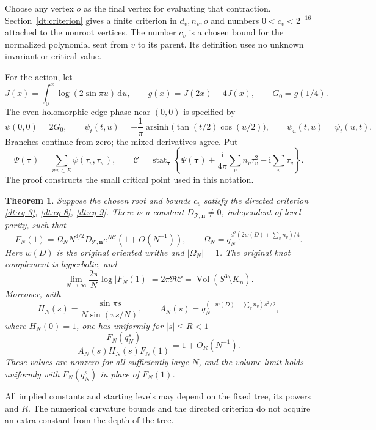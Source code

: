 \documentclass[11pt]{article}
\numberwithin{equation}{section}
\newtheorem{theorem}{Theorem}[section]
\theoremstyle{definition}\newtheorem{definition}[theorem]{Definition}
\theoremstyle{remark}\newtheorem{remark}[theorem]{Remark}
\newcommand{\ii}{\mathrm i}
\newcommand{\dd}{\mathrm d}
\newcommand{\Vol}{\operatorname{Vol}}
\begin{document}
Choose any vertex \(o\) as the final vertex for evaluating that
contraction. Section~\ref{dt:criterion} gives a finite criterion in
\(d_v,n_v,o\) and numbers \(0<c_v<2^{-16}\) attached to the nonroot
vertices. The number \(c_v\) is a chosen bound for the normalized
polynomial sent from \(v\) to its parent. Its definition uses no unknown
invariant or critical value.

For the action, let
\[
 J(x)=\int_0^x\log(2\sin\pi u)\,\dd u,\qquad
 g(x)=J(2x)-4J(x),\qquad G_0=g(1/4).
\]
The even holomorphic edge phase near \((0,0)\) is specified by
\begin{equation}\label{dt:psi}
 \psi(0,0)=2G_0,\qquad
 \psi_t(t,u)=-\frac1\pi\operatorname{arsinh}
                       \bigl(\tan(t/2)\cos(u/2)\bigr),
 \qquad\psi_u(t,u)=\psi_t(u,t).
\end{equation}
Branches continue from zero; the mixed derivatives agree. Put
\[
 \Psi(\boldsymbol\tau)=\sum_{vw\in E}\psi(\tau_v,\tau_w),\qquad
 \mathcal C=\operatorname{stat}_{\boldsymbol\tau}
 \left\{\Psi(\boldsymbol\tau)+\frac{\ii}{4\pi}
             \sum_v n_v\tau_v^2-\ii\sum_v\tau_v\right\}.
\]
The proof constructs the small critical point used in this notation.

\begin{theorem}\label{dt:main}
Suppose the chosen root and bounds \(c_v\) satisfy the directed criterion
\eqref{dt:eq-3}, \eqref{dt:eq-8}, \eqref{dt:eq-9}.
There is a constant \(D_{\mathcal T,\mathbf n}\ne0\), independent of
level parity, such that
\begin{equation}\label{dt:leading}
 F_N(1)=\Omega_N N^{3/2}D_{\mathcal T,\mathbf n}
                  e^{N\mathcal C}(1+O(N^{-1})),\qquad
 \Omega_N=q_N^{d^2(2w(D)+\sum_vn_v)/4}.
\end{equation}
Here \(w(D)\) is the original oriented writhe and \(|\Omega_N|=1\).
The original knot complement is hyperbolic, and
\begin{equation}\label{dt:volume}
 \lim_{N\to\infty}\frac{2\pi}{N}\log|F_N(1)|
       =2\pi\Re\mathcal C=\Vol(S^3\setminus K_{\mathbf n}).
\end{equation}
Moreover, with
\begin{equation}\label{dt:scalars}
 H_N(s)=\frac{\sin\pi s}{N\sin(\pi s/N)},\qquad
 A_N(s)=q_N^{(-w(D)-\sum_vn_v)s^2/2},
\end{equation}
where \(H_N(0)=1\), one has uniformly for \(|s|\le R<1\)
\begin{equation}\label{dt:profile}
 \frac{F_N(q_N^s)}{A_N(s)H_N(s)F_N(1)}=1+O_R(N^{-1}).
\end{equation}
These values are nonzero for all sufficiently large \(N\), and the volume
limit holds uniformly with \(F_N(q_N^s)\) in place of \(F_N(1)\).
\end{theorem}
All implied constants and starting levels may depend on the fixed tree,
its powers and \(R\). The numerical curvature bounds and the directed
criterion do not acquire an extra constant from the depth of the tree.
\end{document}
